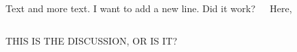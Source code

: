 \documentclass[18pt, a3paper, portrait]{tikzposter}
\begin{document}
\begin{columns}
    {
        Text and more text. I want to add a new line. \newline
        Did it work?
        \vspace{4cm}
    }
 
    \block{~}
    {
        Here,  
        \vspace{4cm}
    }
\end{columns}

{
    THIS IS THE DISCUSSION, OR IS IT?
}
\end{document}
